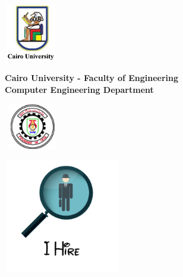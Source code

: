 \documentclass[a4paper,12pt]{report}
\begin{document}
\begin{titlepage}
  
\begin{center}
  \begin{minipage}{2.5cm}
    \begin{center}
      \includegraphics[width=2.3cm,height=2.5cm]{images/logo/uni_logo.jpg}
    \end{center}
  \end{minipage}\hfill
  \begin{minipage}{10cm}
    \begin{center}
      {\bfseries\large Cairo University - Faculty of Engineering}\\[0.1cm]
      {\bfseries\large Computer Engineering Department}\\[0.1cm]
    \end{center}
  \end{minipage}\hfill
  \begin{minipage}{2.5cm}
    \begin{center}
        \includegraphics[width=2.5cm,height=2cm]{images/logo/fac_logo.png}
    \end{center}
  \end{minipage}
  
  \vspace{1cm}
  \begin{minipage}{6cm}
    \begin{center}
        \includegraphics[width=5.1cm,height=5cm]{images/logo/i_hire.png}
    \end{center}
  \end{minipage}






\end{center}
\end{titlepage}
\end{document}
